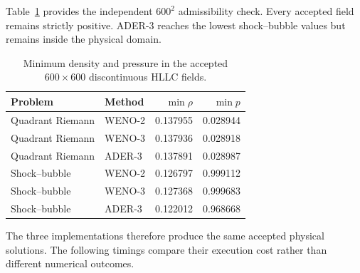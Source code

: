 Table~\ref{tab:highres-positivity} provides the independent \(600^2\) admissibility check.
Every accepted field remains strictly positive. ADER-3 reaches the lowest shock--bubble
values but remains inside the physical domain.

\begin{table}[H]
\centering
\small
\begin{tabular}{llrr}
\toprule
Problem & Method & \(\min\rho\) & \(\min p\) \\
\midrule
Quadrant Riemann & WENO-2 & 0.137955 & 0.028944 \\
Quadrant Riemann & WENO-3 & 0.137936 & 0.028918 \\
Quadrant Riemann & ADER-3 & 0.137891 & 0.028987 \\
Shock--bubble & WENO-2 & 0.126797 & 0.999112 \\
Shock--bubble & WENO-3 & 0.127368 & 0.999683 \\
Shock--bubble & ADER-3 & 0.122012 & 0.968668 \\
\bottomrule
\end{tabular}
\caption{Minimum density and pressure in the accepted \(600\times600\) discontinuous HLLC fields.}
\label{tab:highres-positivity}
\end{table}

The three implementations therefore produce the same accepted physical solutions. The
following timings compare their execution cost rather than different numerical outcomes.

\FloatBarrier
